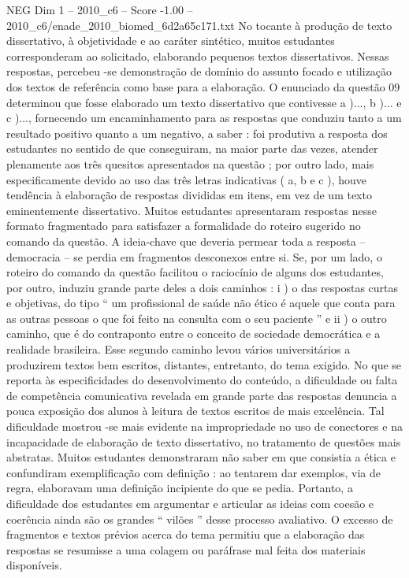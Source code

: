 \begin{textsample}{NEG Dim 1 – 2010\_c6 – Score -1.00 – 2010\_c6/enade\_2010\_biomed\_6d2a65c171.txt}
No tocante à produção de texto dissertativo, à objetividade e ao caráter sintético, muitos estudantes corresponderam ao solicitado, elaborando pequenos textos dissertativos.
Nessas respostas, percebeu -se demonstração de domínio do assunto focado e utilização dos textos de referência como base para a elaboração.
O enunciado da questão 09 determinou que fosse elaborado um texto dissertativo que contivesse a )..., b )... e c )..., fornecendo um encaminhamento para as respostas que conduziu tanto a um resultado positivo quanto a um negativo, a saber : foi produtiva a resposta dos estudantes no sentido de que conseguiram, na maior parte das vezes, atender plenamente aos três quesitos apresentados na questão ; por outro lado, mais especificamente devido ao uso das três letras indicativas ( a, b e c ), houve tendência à elaboração de respostas divididas em itens, em vez de um texto eminentemente dissertativo.
Muitos estudantes apresentaram respostas nesse formato fragmentado para satisfazer a formalidade do roteiro sugerido no comando da questão.
A ideia-chave que deveria permear toda a resposta – democracia – se perdia em fragmentos desconexos entre si.
Se, por um lado, o roteiro do comando da questão facilitou o raciocínio de alguns dos estudantes, por outro, induziu grande parte deles a dois caminhos : i ) o das respostas curtas e objetivas, do tipo “ um profissional de saúde não ético é aquele que conta para as outras pessoas o que foi feito na consulta com o seu paciente ” e ii ) o outro caminho, que é do contraponto entre o conceito de sociedade democrática e a realidade brasileira.
Esse segundo caminho levou vários universitários a produzirem textos bem escritos, distantes, entretanto, do tema exigido.
No que se reporta às especificidades do desenvolvimento do conteúdo, a dificuldade ou falta de competência comunicativa revelada em grande parte das respostas denuncia a pouca exposição dos alunos à leitura de textos escritos de mais excelência.
Tal dificuldade mostrou -se mais evidente na impropriedade no uso de conectores e na incapacidade de elaboração de texto dissertativo, no tratamento de questões mais abstratas.
Muitos estudantes demonstraram não saber em que consistia a ética e confundiram exemplificação com definição : ao tentarem dar exemplos, via de regra, elaboravam uma definição incipiente do que se pedia.
Portanto, a dificuldade dos estudantes em argumentar e articular as ideias com coesão e coerência ainda são os grandes “ vilões ” desse processo avaliativo.
O excesso de fragmentos e textos prévios acerca do tema permitiu que a elaboração das respostas se resumisse a uma colagem ou paráfrase mal feita dos materiais disponíveis.

\end{textsample}
